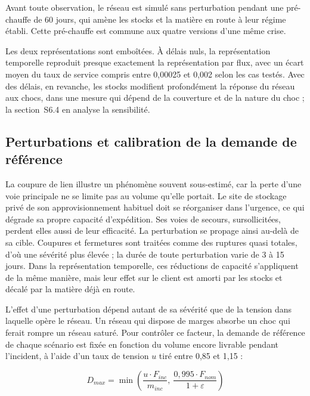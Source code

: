 Avant toute observation, le réseau est simulé sans perturbation pendant une pré-chauffe de 60 jours, qui amène les stocks et la matière en route à leur régime établi. Cette pré-chauffe est commune aux quatre versions d'une même crise.

Les deux représentations sont emboîtées. À délais nuls, la représentation temporelle reproduit presque exactement la représentation par flux, avec un écart moyen du taux de service compris entre 0,00025 et 0,002 selon les cas testés. Avec des délais, en revanche, les stocks modifient profondément la réponse du réseau aux chocs, dans une mesure qui dépend de la couverture et de la nature du choc ; la section~S6.4 en analyse la sensibilité.

\subsection{Perturbations et calibration de la demande de référence}
\label{sec:S3.3}

La coupure de lien illustre un phénomène souvent sous-estimé, car la perte d'une voie principale ne se limite pas au volume qu'elle portait. Le site de stockage privé de son approvisionnement habituel doit se réorganiser dans l'urgence, ce qui dégrade sa propre capacité d'expédition. Ses voies de secours, sursollicitées, perdent elles aussi de leur efficacité. La perturbation se propage ainsi au-delà de sa cible. Coupures et fermetures sont traitées comme des ruptures quasi totales, d'où une sévérité plus élevée ; la durée de toute perturbation varie de 3 à 15 jours. Dans la représentation temporelle, ces réductions de capacité s'appliquent de la même manière, mais leur effet sur le client est amorti par les stocks et décalé par la matière déjà en route.

L'effet d'une perturbation dépend autant de sa sévérité que de la tension dans laquelle opère le réseau. Un réseau qui dispose de marges absorbe un choc qui ferait rompre un réseau saturé. Pour contrôler ce facteur, la demande de référence de chaque scénario est fixée en fonction du volume encore livrable pendant l'incident, à l'aide d'un taux de tension $u$ tiré entre 0,85 et 1,15 :

\begin{equation}
D_{max} = \min\left(\frac{u \cdot F_{inc}}{m_{inc}},\ \frac{0{,}995 \cdot F_{nom}}{1 + \varepsilon}\right)
\label{eq:S2}
\end{equation}

